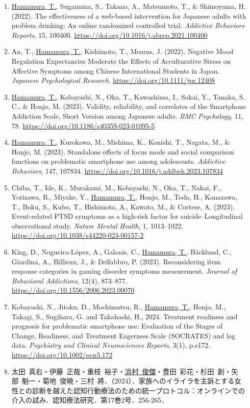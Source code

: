 \documentclass[11pt,a4paper]{article}
\begin{document}
\begin{enumerate}
	\item \underline{Hamamura, T.}, Suganuma, S., Takano, A., Matsumoto, T., \& Shimoyama, H. (2022). The effectiveness of a web-based intervention for Japanese adults with problem drinking: An online randomized controlled trial. \textit{Addictive Behaviors Reports}, 15, 100400. \url{https://doi.org/10.1016/j.abrep.2021.100400}
	\item An, T., \underline{Hamamura, T.}, Kishimoto, T., Mearns, J. (2022). Negative Mood Regulation Expectancies Moderate the Effects of Acculturative Stress on Affective Symptoms among Chinese International Students in Japan. \textit{Japanese Psychological Research}. \url{https://doi.org/10.1111/jpr.12408}
	\item \underline{Hamamura, T.}, Kobayashi, N., Oka, T., Kawashima, I., Sakai, Y., Tanaka, S. C., \& Honjo, M. (2023). Validity, reliability, and correlates of the Smartphone Addiction Scale, Short Version among Japanese adults. \textit{BMC Psychology}, 11, 78. \url{https://doi.org/10.1186/s40359-023-01095-5}
	\item \underline{Hamamura, T.}, Kurokawa, M., Mishima, K., Konishi, T., Nagata, M., \& Honjo, M. (2023). Standalone effects of focus mode and social comparison functions on problematic smartphone use among adolescents. \textit{Addictive Behaviors}, 147, 107834. \url{https://doi.org/10.1016/j.addbeh.2023.107834}
	\item Chiba, T., Ide, K., Murakami, M., Kobayashi, N., Oka, T., Nakai, F., Yorizawa, R., Miyake, Y., \underline{Hamamura, T.}, Honjo, M., Toda, H., Kanazawa, T., Boku, S., Kubo, T., Hishimoto, A., Kawato, M., \&  Cortese, A. (2023). Event-related PTSD symptoms as a high-risk factor for suicide--Longitudinal observational study. \textit{Nature Mental Health}, 1, 1013--1022. \url{https://doi.org/10.1038/s44220-023-00157-2}
	\item King, D., Nogueira-López, A., Galanis, C., \underline{Hamamura, T.}, Bäcklund, C., Giardina, A., Billieux, J., \& Delfabbro, P. (2023). Reconsidering item response categories in gaming disorder symptoms measurement. \textit{Journal of Behavioral Addictions}, 12(4), 873--877. \url{https://doi.org/10.1556/2006.2023.00070}
	\item Kobayashi, N., Jitoku, D., Mochimatsu, R., \underline{Hamamura, T.}, Honjo, M., Takagi, S., Sugihara, G. and Takahashi, H., 2024. Treatment readiness and prognosis for problematic smartphone use: Evaluation of the Stages of Change, Readiness, and Treatment Eagerness Scale (SOCRATES) and log data. \textit{Psychiatry and Clinical Neurosciences Reports}, 3(1), p.e172. \url{https://doi.org/10.1002/pcn5.172}
	\item 太田\ 真右・伊藤\ 正哉・重枝\ 裕子・\underline{浜村\ 俊傑}・豊田\ 彩花・杉田\ 創・矢部\ 魁一・菊地\ 俊暁・三村\ 將．（2024）．家族へのイライラを主訴とする女性との診断を越えた認知行動療法のための統一プロトコル：オンラインでの介入の試み．認知療法研究．第17巻2号．256-265．
\end{enumerate}
\end{document}
